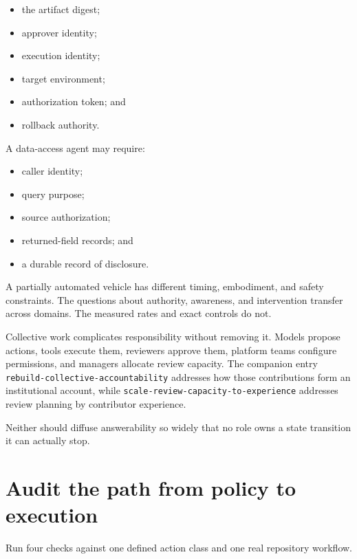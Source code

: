 \begin{itemize}
\tightlist
\item
  the artifact digest;
\item
  approver identity;
\item
  execution identity;
\item
  target environment;
\item
  authorization token; and
\item
  rollback authority.
\end{itemize}


A data-access agent may require:

\begin{itemize}
\tightlist
\item
  caller identity;
\item
  query purpose;
\item
  source authorization;
\item
  returned-field records; and
\item
  a durable record of disclosure.
\end{itemize}

A partially automated vehicle has different timing, embodiment, and safety constraints. The questions about authority, awareness, and intervention transfer across domains. The measured rates and exact controls do not.

Collective work complicates responsibility without removing it. Models propose actions, tools execute them, reviewers approve them, platform teams configure permissions, and managers allocate review capacity. The companion entry \texttt{rebuild-collective-accountability} addresses how those contributions form an institutional account, while \texttt{scale-review-capacity-to-experience} addresses review planning by contributor experience.

Neither should diffuse answerability so widely that no role owns a state transition it can actually stop.

\hypertarget{audit-the-path-from-policy-to-execution}{%
\section{Audit the path from policy to execution}\label{audit-the-path-from-policy-to-execution}}

Run four checks against one defined action class and one real repository workflow.

